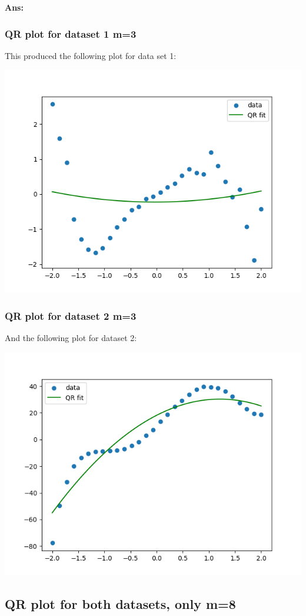 \documentclass[11pt]{article}
\newenvironment{solbox}
  {\begin{mdframed}[linewidth=1pt,linecolor=black,roundcorner=5pt]
   \noindent\textbf{Ans: }\enspace}
  {\end{mdframed}}
\begin{document}
\begin{solbox}
    \subsubsection{QR plot for dataset 1 m=3}
    
    This produced the following plot for data set 1:

    \begin{center}
    \includegraphics[width=0.75\linewidth]{../Figures/M3QR_plot_dataset1.png}
    \end{center}

    \subsubsection{QR plot for dataset 2 m=3}
    
    And the following plot for dataset 2:
    \begin{center}
    \includegraphics[width=0.75\linewidth]{../Figures/M3QR_plot_dataset2.png}
    \end{center}


    \subsection{QR plot for both datasets, only m=8}
    


\end{solbox}
\end{document}
